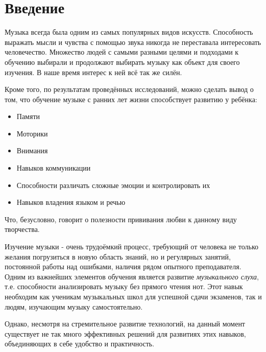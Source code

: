 \chapter*{Введение}
\setlength\parindent{1.5em} 
\par 
Музыка всегда была одним из самых популярных видов искусств. Способность выражать мысли и чувства с помощью звука никогда не переставала интересовать человечество. Множество людей с самыми разными целями и подходами к обучению выбирали и продолжают выбирать музыку как объект для своего изучения. В наше время интерес к ней всё так же силён\cite{thamprasert2023network}.

Кроме того, по результатам проведённых исследований\cite{dumont2017music}, можно сделать вывод о том, что обучение музыке с ранних лет жизни способствует развитию у ребёнка:
\begin{itemize}
\item Памяти
\item Моторики
\item Внимания
\item Навыков коммуникации
\item Способности различать сложные эмоции и контролировать их
\item Навыков владения языком и речью
\end{itemize}\par
Что, безусловно, говорит о полезности прививания любви к данному виду творчества.\par

Изучение музыки - очень трудоёмкий процесс, требующий от человека не только желания погрузиться в новую область знаний, но и регулярных занятий, постоянной работы над ошибками, наличия рядом опытного преподавателя. Одним из важнейших элементов обучения является развитие \textit{музыкального слуха}, т.е. способности анализировать музыку без прямого чтения нот. Этот навык необходим как ученикам музыкальных школ для успешной сдачи экзаменов, так и людям, изучающим музыку самостоятельно.\par

Однако, несмотря на стремительное развитие технологий, на данный момент существует не так много эффективных решений для развитиях этих навыков, объединяющих в себе удобство и практичность.
